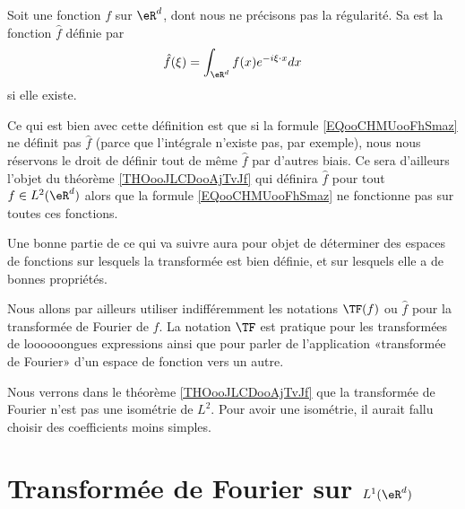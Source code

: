 

\begin{definition}      \label{DEFooRIXGooECoIbx}
    Soit une fonction \( f\) sur \( \eR^d\), dont nous ne précisons pas la régularité. Sa  est la fonction \( \hat f\) définie par
    \begin{equation}        \label{EQooCHMUooFhSmaz}
            \hat f(\xi)=\int_{\eR^d} f(x) e^{-i\xi\cdot x}dx  
    \end{equation}
    si elle existe.
\end{definition}

Ce qui est bien avec cette définition est que si la formule \eqref{EQooCHMUooFhSmaz} ne définit pas \( \hat f\) (parce que l'intégrale n'existe pas, par exemple), nous nous réservons le droit de définir tout de même \( \hat f\) par d'autres biais. Ce sera d'ailleurs l'objet du théorème \ref{THOooJLCDooAjTvJf} qui définira \( \hat f\) pour tout \( f\in L^2(\eR^d)\) alors que la formule \eqref{EQooCHMUooFhSmaz} ne fonctionne pas sur toutes ces fonctions.

Une bonne partie de ce qui va suivre aura pour objet de déterminer des espaces de fonctions sur lesquels la transformée est bien définie, et sur lesquels elle a de bonnes propriétés.

Nous allons par ailleurs utiliser indifféremment les notations \( \TF(f)\) ou \( \hat f\) pour la transformée de Fourier de \( f\). La notation \( \TF\) est pratique pour les transformées de loooooongues expressions ainsi que pour parler de l'application «transformée de Fourier» d'un espace de fonction vers un autre.

\begin{normaltext}
    Nous verrons dans le théorème \ref{THOooJLCDooAjTvJf} que la transformée de Fourier n'est pas une isométrie de \( L^2\). Pour avoir une isométrie, il aurait fallu choisir des coefficients moins simples.
\end{normaltext}

\section{Transformée de Fourier sur \( L^1(\eR^d)\)}

